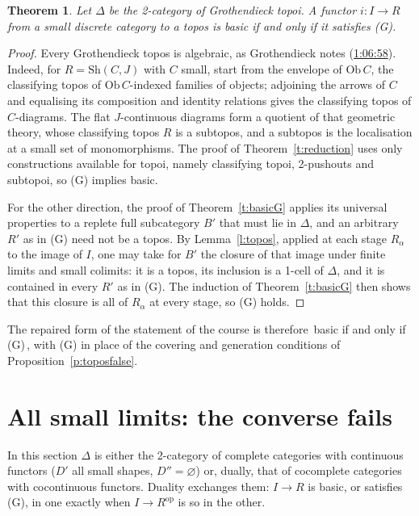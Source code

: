 \documentclass[11pt,a4paper]{amsart}
\newtheorem{theorem}{Theorem}[section]
\theoremstyle{definition}
\theoremstyle{remark}
\newcommand{\q}[1]{\guillemotleft\,#1\,\guillemotright}
\newcommand{\ts}[3]{\href{https://www.youtube.com/watch?v=#1&t=#2}{#3}}
\begin{document}
\begin{theorem}\label{t:topos}
Let $\Delta$ be the 2-category of Grothendieck topoi. A functor $i\colon I\to R$ from a small discrete category to a topos is basic if and only if it satisfies (G).
\end{theorem}

\begin{proof}
Every Grothendieck topos is algebraic, as Grothendieck notes (\ts{ORG14LNb5gE}{1h6m58s}{1:06:58}). Indeed, for $R=\mathrm{Sh}(C,J)$ with $C$ small, start from the envelope of $\mathrm{Ob}\,C$, the classifying topos of $\mathrm{Ob}\,C$-indexed families of objects; adjoining the arrows of $C$ and equalising its composition and identity relations gives the classifying topos of $C$-diagrams. The flat $J$-continuous diagrams form a quotient of that geometric theory, whose classifying topos $R$ is a subtopos, and a subtopos is the localisation at a small set of monomorphisms. The proof of Theorem~\ref{t:reduction} uses only constructions available for topoi, namely classifying topoi, 2-pushouts and subtopoi, so (G) implies basic.

For the other direction, the proof of Theorem~\ref{t:basicG} applies its universal properties to a replete full subcategory $B'$ that must lie in $\Delta$, and an arbitrary $R'$ as in (G) need not be a topos. By Lemma~\ref{l:topos}, applied at each stage $R_\alpha$ to the image of $I$, one may take for $B'$ the closure of that image under finite limits and small colimits: it is a topos, its inclusion is a 1-cell of $\Delta$, and it is contained in every $R'$ as in (G). The induction of Theorem~\ref{t:basicG} then shows that this closure is all of $R_\alpha$ at every stage, so (G) holds.
\end{proof}

The repaired form of the statement of the course is therefore \q{basic if and only if (G)}, with (G) in place of the covering and generation conditions of Proposition~\ref{p:toposfalse}.

\section{All small limits: the converse fails}\label{sec:set}

In this section $\Delta$ is either the 2-category of complete categories with continuous functors ($D'$ all small shapes, $D''=\varnothing$) or, dually, that of cocomplete categories with cocontinuous functors. Duality exchanges them: $I\to R$ is basic, or satisfies (G), in one exactly when $I\to R^{\mathrm{op}}$ is so in the other.
\end{document}
